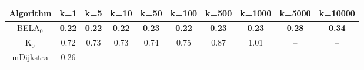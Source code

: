 \begin{tabular}{c|ccccccccc}\toprule
Algorithm & k=1 & k=5 & k=10 & k=50 & k=100 & k=500 & k=1000 & k=5000 & k=10000 \\ \midrule
BELA$_0$ & \textbf{0.22} & \textbf{0.22} & \textbf{0.22} & \textbf{0.23} & \textbf{0.22} & \textbf{0.23} & \textbf{0.23} & \textbf{0.28} & \textbf{0.34} \\
K$_0$ & 0.72 & 0.73 & 0.73 & 0.74 & 0.75 & 0.87 & 1.01 & -- & -- \\
mDijkstra & 0.26 & -- & -- & -- & -- & -- & -- & -- & -- \\ \bottomrule 
\end{tabular}
